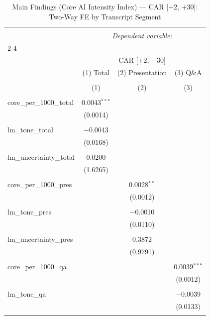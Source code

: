 
\begin{table}[!htbp] \centering 
  \caption{Main Findings (Core AI Intensity Index) — CAR [+2, +30]: Two-Way FE by Transcript Segment} 
  \label{} 
\begin{tabular}{@{\extracolsep{5pt}}lccc} 
\\[-1.8ex]\hline 
\hline \\[-1.8ex] 
 & \multicolumn{3}{c}{\textit{Dependent variable:}} \\ 
\cline{2-4} 
\\[-1.8ex] & \multicolumn{3}{c}{CAR [+2, +30]} \\ 
 & (1) Total & (2) Presentation & (3) Q\&A \\ 
\\[-1.8ex] & (1) & (2) & (3)\\ 
\hline \\[-1.8ex] 
 core\_per\_1000\_total & 0.0043$^{***}$ &  &  \\ 
  & (0.0014) &  &  \\ 
  & & & \\ 
 lm\_tone\_total & $-$0.0043 &  &  \\ 
  & (0.0168) &  &  \\ 
  & & & \\ 
 lm\_uncertainty\_total & 0.0200 &  &  \\ 
  & (1.6265) &  &  \\ 
  & & & \\ 
 core\_per\_1000\_pres &  & 0.0028$^{**}$ &  \\ 
  &  & (0.0012) &  \\ 
  & & & \\ 
 lm\_tone\_pres &  & $-$0.0010 &  \\ 
  &  & (0.0110) &  \\ 
  & & & \\ 
 lm\_uncertainty\_pres &  & 0.3872 &  \\ 
  &  & (0.9791) &  \\ 
  & & & \\ 
 core\_per\_1000\_qa &  &  & 0.0039$^{***}$ \\ 
  &  &  & (0.0012) \\ 
  & & & \\ 
 lm\_tone\_qa &  &  & $-$0.0039 \\ 
  &  &  & (0.0133) \\ 
  & & & \\ 

\end{tabular}
\end{table}
